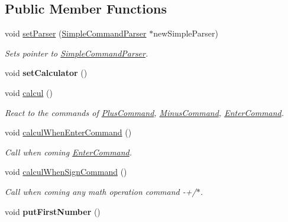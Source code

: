\subsection*{Public Member Functions}
\begin{DoxyCompactItemize}
\item 
void \hyperlink{class_init_simple_command_parser_state_a588509c1636eafee28052b3680fbe42a}{set\+Parser} (\hyperlink{class_simple_command_parser}{Simple\+Command\+Parser} $\ast$new\+Simple\+Parser)
\begin{DoxyCompactList}\small\item\em Sets pointer to \hyperlink{class_simple_command_parser}{Simple\+Command\+Parser}. \end{DoxyCompactList}\item 
\hypertarget{class_init_simple_command_parser_state_a3bcac8081cc8f3a27d730f461f962188}{}void {\bfseries set\+Calculator} ()\label{class_init_simple_command_parser_state_a3bcac8081cc8f3a27d730f461f962188}

\item 
void \hyperlink{class_init_simple_command_parser_state_aeb8397f1269be0423bda0a0dfd9937dd}{calcul} ()
\begin{DoxyCompactList}\small\item\em React to the commands of \hyperlink{class_plus_command}{Plus\+Command}, \hyperlink{class_minus_command}{Minus\+Command}, \hyperlink{class_enter_command}{Enter\+Command}. \end{DoxyCompactList}\item 
\hypertarget{class_init_simple_command_parser_state_af3eb13c74b8e2a2902ad1b8de9b0e34f}{}void \hyperlink{class_init_simple_command_parser_state_af3eb13c74b8e2a2902ad1b8de9b0e34f}{calcul\+When\+Enter\+Command} ()\label{class_init_simple_command_parser_state_af3eb13c74b8e2a2902ad1b8de9b0e34f}

\begin{DoxyCompactList}\small\item\em Call when coming \hyperlink{class_enter_command}{Enter\+Command}. \end{DoxyCompactList}\item 
\hypertarget{class_init_simple_command_parser_state_a67c7c25342ccd157c6d49d6a8776cc7a}{}void \hyperlink{class_init_simple_command_parser_state_a67c7c25342ccd157c6d49d6a8776cc7a}{calcul\+When\+Sign\+Command} ()\label{class_init_simple_command_parser_state_a67c7c25342ccd157c6d49d6a8776cc7a}

\begin{DoxyCompactList}\small\item\em Call when coming any math operation command -\/+/$\ast$. \end{DoxyCompactList}\item 
\hypertarget{class_init_simple_command_parser_state_a1c50649374b1ccb8c7fd33bf6a292a82}{}void {\bfseries put\+First\+Number} ()\label{class_init_simple_command_parser_state_a1c50649374b1ccb8c7fd33bf6a292a82}


\end{DoxyCompactItemize}
